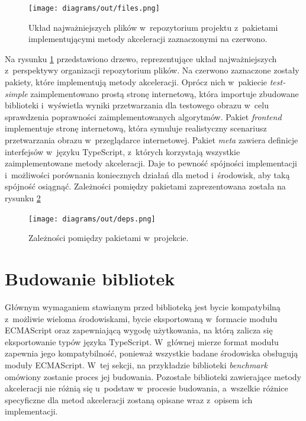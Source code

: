 \begin{figure}[ht]
    \centering
    \texttt{[image: diagrams/out/files.png]}
    \caption{Układ najważniejszych plików w~repozytorium projektu z~pakietami implementującymi metody akceleracji zaznaczonymi na czerwono.}
    \label{fig:files}
\end{figure}

Na rysunku \ref{fig:files} przedstawiono drzewo, reprezentujące układ najważniejszych z~perspektywy organizacji repozytorium plików. Na czerwono zaznaczone zostały pakiety, które implementują metody akceleracji. Oprócz nich w~pakiecie \textit{test-simple} zaimplementowano prostą stronę internetową, która importuje zbudowane biblioteki i~wyświetla wyniki przetwarzania dla testowego obrazu w~celu sprawdzenia poprawności zaimplementowanych algorytmów. Pakiet \textit{frontend} implementuje stronę internetową, która symuluje realistyczny scenariusz przetwarzania obrazu w~przeglądarce internetowej. Pakiet \textit{meta} zawiera definicje interfejsów w~języku TypeScript, z~których korzystają wszystkie zaimplementowane metody akceleracji. Daje to pewność spójności implementacji i~możliwości porównania koniecznych działań dla metod i~środowisk, aby taką spójność osiągnąć. Zależności pomiędzy pakietami zaprezentowana została na rysunku \ref{fig:deps}

\begin{figure}[ht]
    \centering
    \texttt{[image: diagrams/out/deps.png]}
    \caption{Zależności pomiędzy pakietami w~projekcie.}
    \label{fig:deps}
\end{figure}

\section{Budowanie bibliotek}

Głównym wymaganiem stawianym przed biblioteką jest bycie kompatybilną z~możliwie wieloma środowiskami, bycie eksportowaną w~formacie modułu ECMAScript oraz zapewniającą wygodę użytkowania, na którą zalicza się eksportowanie typów języka TypeScript. W~głównej mierze format modułu zapewnia jego kompatybilność, ponieważ wszystkie badane środowiska obsługują moduły ECMAScript. W~tej sekcji, na przykładzie biblioteki \textit{benchmark} omówiony zostanie proces jej budowania. Pozostałe biblioteki zawierające metody akceleracji nie różnią się u~podstaw w~procesie budowania, a~wszelkie różnice specyficzne dla metod akceleracji zostaną opisane wraz z~opisem ich implementacji.

